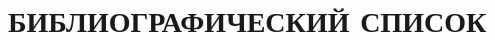 \chapter{БИБЛИОГРАФИЧЕСКИЙ СПИСОК}

\renewcommand{\bibsection}{\section*{Cписок использованных источников}}



\renewcommand{\bibsection}{\section*{Cписок публикаций соискателя}}
% 

